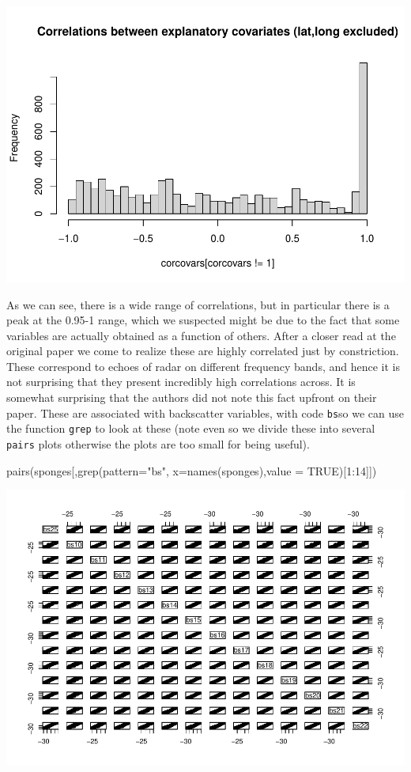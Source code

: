 \documentclass[
]{book}
\newenvironment{Shaded}{\begin{snugshade}}{\end{snugshade}}
\newcommand{\AttributeTok}[1]{\textcolor[rgb]{0.77,0.63,0.00}{#1}}
\newcommand{\ConstantTok}[1]{\textcolor[rgb]{0.00,0.00,0.00}{#1}}
\newcommand{\DecValTok}[1]{\textcolor[rgb]{0.00,0.00,0.81}{#1}}
\newcommand{\FunctionTok}[1]{\textcolor[rgb]{0.00,0.00,0.00}{#1}}
\newcommand{\NormalTok}[1]{#1}
\newcommand{\SpecialCharTok}[1]{\textcolor[rgb]{0.00,0.00,0.00}{#1}}
\newcommand{\StringTok}[1]{\textcolor[rgb]{0.31,0.60,0.02}{#1}}
\begin{document}
\includegraphics{ECOMODbook_files/figure-latex/unnamed-chunk-23-1.pdf}

As we can see, there is a wide range of correlations, but in particular there is a peak at the 0.95-1 range, which we suspected might be due to the fact that some variables are actually obtained as a function of others. After a closer read at the original paper we come to realize these are highly correlated just by constriction. These correspond to echoes of radar on different frequency bands, and hence it is not surprising that they present incredibly high correlations across. It is somewhat surprising that the authors did not note this fact upfront on their paper. These are associated with backscatter variables, with code \texttt{bs}so we can use the function \texttt{grep} to look at these (note even so we divide these into several \texttt{pairs} plots otherwise the plots are too small for being useful).

\begin{Shaded}
\begin{Highlighting}[]
\FunctionTok{pairs}\NormalTok{(sponges[,}\FunctionTok{grep}\NormalTok{(}\AttributeTok{pattern=}\StringTok{"bs"}\NormalTok{, }\AttributeTok{x=}\FunctionTok{names}\NormalTok{(sponges),}\AttributeTok{value =} \ConstantTok{TRUE}\NormalTok{)[}\DecValTok{1}\SpecialCharTok{:}\DecValTok{14}\NormalTok{]])}
\end{Highlighting}
\end{Shaded}

\includegraphics{ECOMODbook_files/figure-latex/unnamed-chunk-24-1.pdf}
\end{document}
